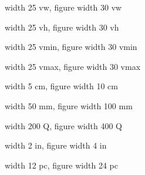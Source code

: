 \documentclass[a4paper,landscape]{article}
\begin{document}
\begin{figure}
\noindent{}
\caption{width 25 vw, figure width 30 vw}
\end{figure}

\begin{figure}
\noindent{}
\caption{width 25 vh, figure width 30 vh}
\end{figure}

\begin{figure}
\noindent{}
\caption{width 25 vmin, figure width 30 vmin}
\end{figure}

\begin{figure}
\noindent{}
\caption{width 25 vmax, figure width 30 vmax}
\end{figure}

\begin{figure}
\noindent{}
\caption{width 5 cm, figure width 10 cm}
\end{figure}

\begin{figure}
\noindent{}
\caption{width 50 mm, figure width 100 mm}
\end{figure}

\begin{figure}
\noindent{}
\caption{width 200 Q, figure width 400 Q}
\end{figure}

\begin{figure}
\noindent{}
\caption{width 2 in, figure width 4 in}
\end{figure}

\begin{figure}
\noindent{}
\caption{width 12 pc, figure width 24 pc}
\end{figure}
\end{document}
